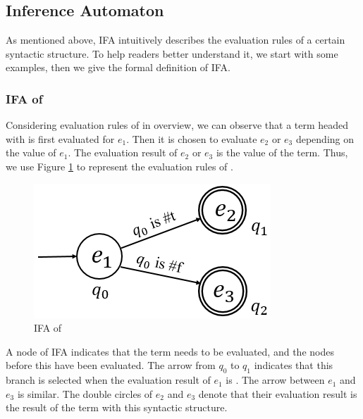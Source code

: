 \subsection{Inference Automaton}

As mentioned above, IFA intuitively describes the evaluation rules of a certain syntactic structure. To help readers better understand it, we start with some examples, then we give the formal definition of IFA.

\subsubsection{IFA of }

Considering evaluation rules of  in overview, we can observe that a term headed with  is first evaluated for $e_1$. Then it is chosen to evaluate $e_2$ or $e_3$ depending on the value of $e_1$. The evaluation result of $e_2$ or $e_3$ is the value of the term. Thus, we use Figure \ref{fig:ifa-if} to represent the evaluation rules of .

\begin{figure}[t]
	\centering
	\includegraphics[scale=0.25]{images/ifa/ifa-if.png}
	\caption{IFA of }
	\label{fig:ifa-if}
\end{figure}

A node of IFA indicates that the term needs to be evaluated, and the nodes before this have been evaluated. The arrow from $q_0$ to $q_1$ indicates that this branch is selected when the evaluation result of $e_1$ is . The arrow between $e_1$ and $e_3$ is similar. The double circles of $e_2$ and $e_3$ denote that their evaluation result is the result of the term with this syntactic structure. 

